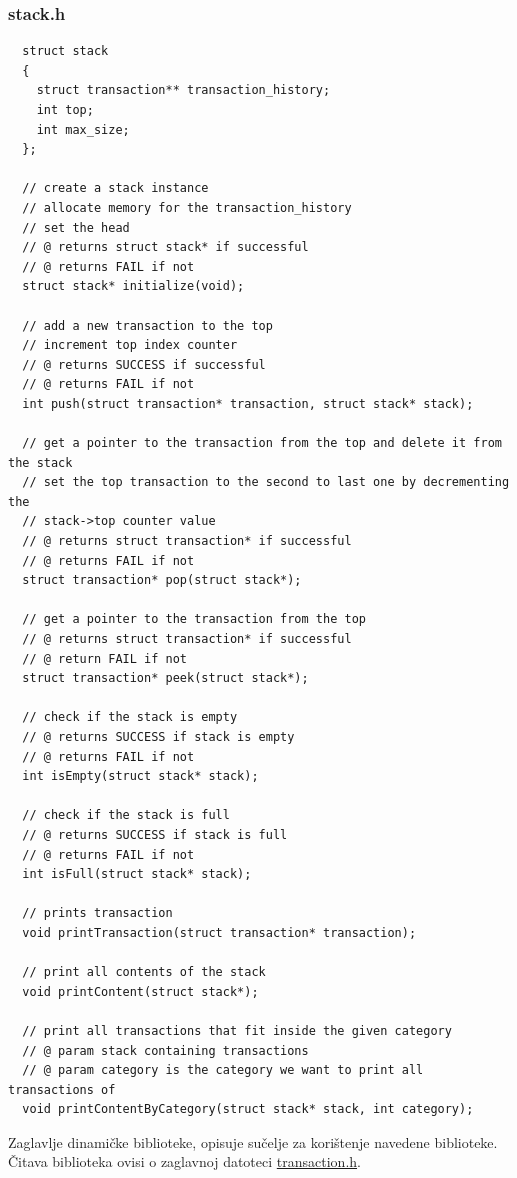 \documentclass[12pt, letterpaper]{article}
\begin{document}
  \subsubsection{stack.h} \label{stack.h}
  \begin{verbatim}
  struct stack
  {
    struct transaction** transaction_history;
    int top;
    int max_size;
  };

  // create a stack instance
  // allocate memory for the transaction_history
  // set the head
  // @ returns struct stack* if successful
  // @ returns FAIL if not
  struct stack* initialize(void);

  // add a new transaction to the top
  // increment top index counter
  // @ returns SUCCESS if successful
  // @ returns FAIL if not
  int push(struct transaction* transaction, struct stack* stack);

  // get a pointer to the transaction from the top and delete it from the stack
  // set the top transaction to the second to last one by decrementing the 
  // stack->top counter value
  // @ returns struct transaction* if successful
  // @ returns FAIL if not
  struct transaction* pop(struct stack*);

  // get a pointer to the transaction from the top
  // @ returns struct transaction* if successful
  // @ return FAIL if not
  struct transaction* peek(struct stack*);

  // check if the stack is empty
  // @ returns SUCCESS if stack is empty
  // @ returns FAIL if not
  int isEmpty(struct stack* stack);

  // check if the stack is full
  // @ returns SUCCESS if stack is full
  // @ returns FAIL if not
  int isFull(struct stack* stack);

  // prints transaction
  void printTransaction(struct transaction* transaction);

  // print all contents of the stack
  void printContent(struct stack*);

  // print all transactions that fit inside the given category
  // @ param stack containing transactions
  // @ param category is the category we want to print all transactions of
  void printContentByCategory(struct stack* stack, int category);

  \end{verbatim}
  Zaglavlje dinamičke biblioteke, opisuje sučelje za korištenje navedene biblioteke. Čitava biblioteka ovisi o zaglavnoj datoteci \hyperref[struct_transaction]{transaction.h}.
\end{document}
